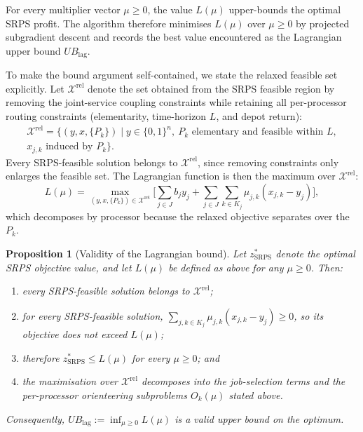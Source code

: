 \documentclass[preprint,12pt]{elsarticle}
\newtheorem{proposition}{Proposition}
\begin{document}
For every multiplier vector $\mu\ge 0$, the value $L(\mu)$ upper-bounds the optimal SRPS profit. The algorithm therefore minimises $L(\mu)$ over $\mu\ge 0$ by projected subgradient descent and records the best value encountered as the Lagrangian upper bound $UB_{\text{lag}}$.

To make the bound argument self-contained, we state the relaxed feasible set explicitly. Let $\mathcal{X}^{\mathrm{rel}}$ denote the set obtained from the SRPS feasible region by removing the joint-service coupling constraints while retaining all per-processor routing constraints (elementarity, time-horizon $L$, and depot return):
\begin{multline*}
\mathcal{X}^{\mathrm{rel}} = \bigl\{(y,x,\{P_k\}) \mid y\in\{0,1\}^n,\ P_k\text{ elementary and feasible within }L,\\
 x_{j,k}\text{ induced by }P_k\bigr\}.
\end{multline*}
Every SRPS-feasible solution belongs to $\mathcal{X}^{\mathrm{rel}}$, since removing constraints only enlarges the feasible set. The Lagrangian function is then the maximum over $\mathcal{X}^{\mathrm{rel}}$:
\[
L(\mu) = \max_{(y,x,\{P_k\})\in\mathcal{X}^{\mathrm{rel}}} \biggl[\sum_{j\in J} b_j y_j + \sum_{j\in J}\sum_{k\in K_j}\mu_{j,k}(x_{j,k}-y_j)\biggr],
\]
which decomposes by processor because the relaxed objective separates over the $P_k$.

\begin{proposition}[Validity of the Lagrangian bound]\label{prop:main_valid}
Let $z^*_{\mathrm{SRPS}}$ denote the optimal SRPS objective value, and let $L(\mu)$ be defined as above for any $\mu\ge 0$. Then:
\begin{enumerate}[label=(\alph*)]
  \item every SRPS-feasible solution belongs to $\mathcal{X}^{\mathrm{rel}}$;
  \item for every SRPS-feasible solution, $\sum_{j,k\in K_j}\mu_{j,k}(x_{j,k}-y_j)\ge 0$, so its objective does not exceed $L(\mu)$;
  \item therefore $z^*_{\mathrm{SRPS}} \le L(\mu)$ for every $\mu\ge 0$; and
  \item the maximisation over $\mathcal{X}^{\mathrm{rel}}$ decomposes into the job-selection terms and the per-processor orienteering subproblems $O_k(\mu)$ stated above.
\end{enumerate}
Consequently, $UB_{\mathrm{lag}} := \inf_{\mu\ge 0} L(\mu)$ is a valid upper bound on the optimum.
\end{proposition}
\end{document}
